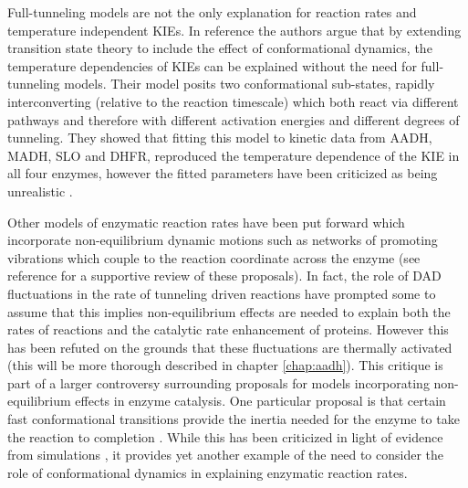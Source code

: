 Full-tunneling models are not the only explanation for reaction rates and temperature independent KIEs. In reference \cite{glowackiProteinDynamicsEnzyme2012, glowackiTakingOckhamRazor2012b} the authors argue that by extending transition state theory to include the effect of conformational dynamics, the temperature dependencies of KIEs can be explained without the need for full-tunneling models. Their model posits two conformational sub-states, rapidly interconverting (relative to the reaction timescale) which both react  via different pathways and therefore with different activation energies and different degrees of tunneling. They showed that fitting this model to kinetic data from AADH, MADH, SLO and DHFR, reproduced the temperature dependence of the KIE in all four enzymes, however the fitted parameters have been criticized as being unrealistic \cite{klinmanHydrogenTunnelingLinks2013}. 

Other models of enzymatic reaction rates have been put forward which incorporate non-equilibrium dynamic motions such as networks of promoting vibrations which couple to the reaction coordinate across the enzyme  (see reference \cite{antoniouProteinDynamicsEnzymatic2011} for a supportive review of these proposals). In fact, the role of DAD fluctuations in the rate of tunneling driven reactions have prompted some \cite{adamczykCatalysisDihydrofolateReductase2011, pisliakovEnzymeMillisecondConformational2009} to assume that this implies non-equilibrium effects are needed to explain both the rates of reactions and the catalytic rate enhancement of proteins. However this has been refuted \cite{klinmanHydrogenTunnelingLinks2013} on the grounds that these fluctuations are thermally activated (this will be more thorough described  in chapter \ref{chap:aadh}). This critique is part of a larger controversy  \cite{klinmanHydrogenTunnelingLinks2013, puMultidimensionalTunnelingRecrossing2006, mcgeaghProteinDynamicsEnzyme2011,glowackiTakingOckhamRazor2012b,glowackiProteinDynamicsEnzyme2012} surrounding proposals for models incorporating non-equilibrium effects in enzyme catalysis. One particular proposal is that certain fast conformational transitions provide the inertia needed for the enzyme to take the reaction to completion \cite{eisenmesserIntrinsicDynamicsEnzyme2005, henzler-wildmanIntrinsicMotionsEnzymatic2007, olssonSoluteSolventDynamics2004}. While this has been criticized in light of evidence from simulations \cite{kamerlinMultiscaleModelingBiological2011}, it provides yet another example of the need to consider the role of conformational dynamics in explaining enzymatic reaction rates.  


